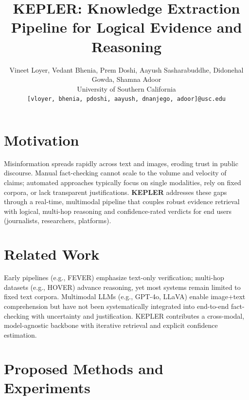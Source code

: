 \documentclass[11pt]{article}
\title{KEPLER: Knowledge Extraction Pipeline for Logical Evidence and Reasoning}
\author{
  Vineet Loyer, Vedant Bhenia, Prem Doshi, Aayush Sasharabuddhe, Didonehal Gowda, Shamna Adoor \\  
  University of Southern California \\
  \texttt{[vloyer, bhenia, pdoshi, aayush, dnanjego, adoor]@usc.edu}
}
\begin{document}
\maketitle

\section{Motivation}
Misinformation spreads rapidly across text and images, eroding trust in public discourse. Manual fact-checking cannot scale to the volume and velocity of claims; automated approaches typically focus on single modalities, rely on fixed corpora, or lack transparent justifications. \textbf{KEPLER} addresses these gaps through a real-time, multimodal pipeline that couples robust evidence retrieval with logical, multi-hop reasoning and confidence-rated verdicts for end users (journalists, researchers, platforms).

\section{Related Work}
Early pipelines (e.g., FEVER) emphasize text-only verification; multi-hop datasets (e.g., HOVER) advance reasoning, yet most systems remain limited to fixed text corpora. Multimodal LLMs (e.g., GPT-4o, LLaVA) enable image+text comprehension but have not been systematically integrated into end-to-end fact-checking with uncertainty and justification. KEPLER contributes a cross-modal, model-agnostic backbone with iterative retrieval and explicit confidence estimation.

\section{Proposed Methods and Experiments}
\end{document}
